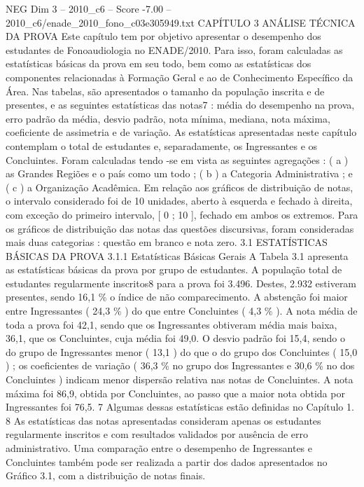 \begin{textsample}{NEG Dim 3 – 2010\_c6 – Score -7.00 – 2010\_c6/enade\_2010\_fono\_c03e305949.txt}  \label{ex:f3_neg_008}
CAPÍTULO 3 ANÁLISE TÉCNICA DA PROVA Este capítulo tem por objetivo apresentar o desempenho dos estudantes de Fonoaudiologia no ENADE/2010.
Para isso, foram calculadas as estatísticas básicas da prova em seu todo, bem como as estatísticas dos componentes relacionadas à Formação Geral e ao de Conhecimento Específico da Área.
Nas tabelas, são apresentados o tamanho da população inscrita e de presentes, e as seguintes estatísticas das notas7 : média do desempenho na prova, erro padrão da média, desvio padrão, nota mínima, mediana, nota máxima, coeficiente de assimetria e de variação.
As estatísticas apresentadas neste capítulo contemplam o total de estudantes e, separadamente, os Ingressantes e os Concluintes.
Foram calculadas tendo -se em vista as seguintes agregações : ( a ) as Grandes Regiões e o país como um todo ; ( b ) a Categoria Administrativa ; e ( c ) a Organização Acadêmica.
Em relação aos gráficos de distribuição de notas, o intervalo considerado foi de 10 unidades, aberto à esquerda e fechado à direita, com exceção do primeiro intervalo, [ 0 ; 10 ], fechado em ambos os extremos.
Para os gráficos de distribuição das notas das questões discursivas, foram consideradas mais duas categorias : questão em branco e nota zero. 3.1 ESTATÍSTICAS BÁSICAS DA PROVA 3.1.1 Estatísticas Básicas Gerais A Tabela 3.1 apresenta as estatísticas básicas da prova por grupo de estudantes.
A população total de estudantes regularmente inscritos8 para a prova foi 3.496.
Destes, 2.932 estiveram presentes, sendo 16,1 \% o índice de não comparecimento.
A abstenção foi maior entre Ingressantes ( 24,3 \% ) do que entre Concluintes ( 4,3 \% ).
A nota média de toda a prova foi 42,1, sendo que os Ingressantes obtiveram média mais baixa, 36,1, que os Concluintes, cuja média foi 49,0.
O desvio padrão foi 15,4, sendo o do grupo de Ingressantes menor ( 13,1 ) do que o do grupo dos Concluintes ( 15,0 ) ; os coeficientes de variação ( 36,3 \% no grupo dos Ingressantes e 30,6 \% no dos Concluintes ) indicam menor dispersão relativa nas notas de Concluintes.
A nota máxima foi 86,9, obtida por Concluintes, ao passo que a maior nota obtida por Ingressantes foi 76,5. 7 Algumas dessas estatísticas estão definidas no Capítulo 1. 8 As estatísticas das notas apresentadas consideram apenas os estudantes regularmente inscritos e com resultados validados por ausência de erro administrativo.
Uma comparação entre o desempenho de Ingressantes e Concluintes também pode ser realizada a partir dos dados apresentados no Gráfico 3.1, com a distribuição de notas finais.

\end{textsample}
